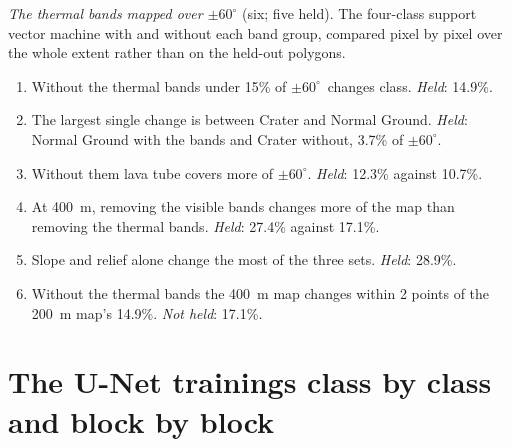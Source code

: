 \documentclass[twocolumn]{aastex701}
\newcommand{\pmsixty}{$\pm60^{\circ}$}
\begin{document}
\emph{The thermal bands mapped over \pmsixty} (six; five held). The four-class support vector machine with and
without each band group, compared pixel by pixel over the whole extent rather than on the held-out polygons.
\begin{enumerate}
\item[M1] Without the thermal bands under 15\% of \pmsixty\ changes class. \emph{Held}: 14.9\%.
\item[M2] The largest single change is between Crater and Normal Ground. \emph{Held}: Normal Ground with the bands
and Crater without, 3.7\% of \pmsixty.
\item[M3] Without them lava tube covers more of \pmsixty. \emph{Held}: 12.3\% against 10.7\%.
\item[M4] At 400~m, removing the visible bands changes more of the map than removing the thermal bands.
\emph{Held}: 27.4\% against 17.1\%.
\item[M5] Slope and relief alone change the most of the three sets. \emph{Held}: 28.9\%.
\item[M6] Without the thermal bands the 400~m map changes within 2 points of the 200~m map's 14.9\%. \emph{Not held}:
17.1\%.
\end{enumerate}

\section{The U-Net trainings class by class and block by block} \label{app:perclass}
\end{document}
